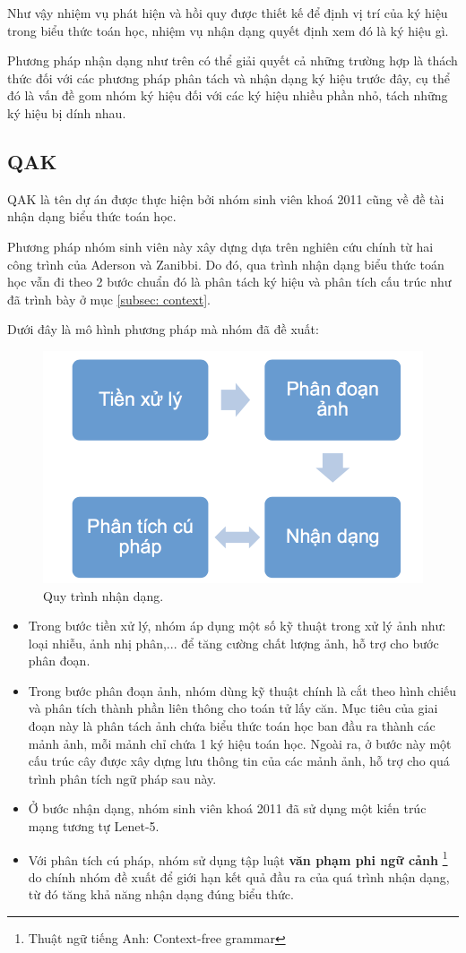\documentclass[a4paper,12pt]{article}
\begin{document}
	Như vậy nhiệm vụ phát hiện và hồi quy được thiết kế để định vị trí của ký hiệu trong biểu thức toán học, nhiệm vụ nhận dạng quyết định xem đó là ký hiệu gì.
	
	Phương pháp nhận dạng như trên có thể giải quyết cả những trường hợp là thách thức đối với các phương pháp phân tách và nhận dạng ký hiệu trước đây, cụ thể đó là vấn đề gom nhóm ký hiệu đối với các ký hiệu nhiều phần nhỏ, tách những ký hiệu bị dính nhau.
	
	\subsection{QAK\cite{qak}}
	QAK là tên dự án được thực hiện bởi nhóm sinh viên khoá 2011 cũng về đề tài nhận dạng biểu thức toán học.
	
	Phương pháp nhóm sinh viên này xây dựng dựa trên nghiên cứu chính từ hai công trình của Aderson\cite{anderson} và Zanibbi\cite{zanibbi}. Do đó, qua trình nhận dạng biểu thức toán học vẫn đi theo 2 bước chuẩn đó là phân tách ký hiệu và phân tích cấu trúc như đã trình bày ở mục \ref{subsec: context}. 
	
	Dưới đây là mô hình phương pháp mà nhóm đã đề xuất:
	
	\begin{figure}[!h]
		\centering
		\includegraphics[width=0.5\linewidth]{2011.png}
		\vspace{1cm}
		\caption{Quy trình nhận dạng.}
		
	\end{figure}
	
	\begin{itemize}
		\item Trong bước tiền xử lý, nhóm áp dụng một số kỹ thuật trong xử lý ảnh như: loại nhiễu, ảnh nhị phân,... để tăng cường chất lượng ảnh, hỗ trợ cho bước phân đoạn.
		\item Trong bước phân đoạn ảnh, nhóm dùng kỹ thuật chính là cắt theo hình chiếu\cite{segment} và phân tích thành phần liên thông\cite{segment} cho toán tử lấy căn. Mục tiêu của giai đoạn này là phân tách ảnh chứa biểu thức toán học ban đầu ra thành các mảnh ảnh, mỗi mảnh chỉ chứa 1 ký hiệu toán học. Ngoài ra, ở bước này một cấu trúc cây được xây dựng lưu thông tin của các mảnh ảnh, hỗ trợ cho quá trình phân tích ngữ pháp sau này.
		\item Ở bước nhận dạng, nhóm sinh viên khoá 2011 đã sử dụng một kiến trúc mạng tương tự Lenet-5\cite{yanlecun}.
		\item Với phân tích cú pháp, nhóm sử dụng tập luật \textbf{văn phạm phi ngữ cảnh} \footnote{Thuật ngữ tiếng Anh: Context-free grammar} do chính nhóm đề xuất để giới hạn kết quả đầu ra của quá trình nhận dạng, từ đó tăng khả năng nhận dạng đúng biểu thức. 
	\end{itemize}
	
\end{document}
